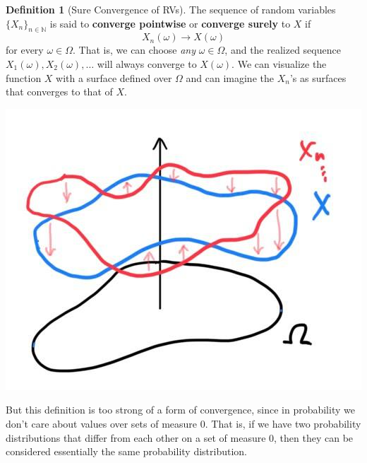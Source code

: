 \documentclass{article}
\theoremstyle{definition}
\theoremstyle{remark}
\theoremstyle{definition}
\newtheorem{definition}{Definition}[section]
\begin{document}
\begin{definition}[Sure Convergence of RVs]
The sequence of random variables $\{ X_n\}_{n \in \mathbb{N}}$ is said to \textbf{converge pointwise} or \textbf{converge surely} to $X$ if 
\[X_n (\omega) \rightarrow X (\omega)\]
for every $\omega \in \Omega$. That is, we can choose \textit{any} $\omega \in \Omega$, and the realized sequence $X_1 (\omega), X_2 (\omega), \ldots$ will always converge to $X(\omega)$. We can visualize the function $X$ with a surface defined over $\Omega$ and can imagine the $X_n$'s as surfaces that converges to that of $X$. 
\begin{center}
    \includegraphics[scale=0.3]{img/sure_convergence.jpg}
\end{center}
\end{definition}

But this definition is too strong of a form of convergence, since in probability we don't care about values over sets of measure $0$. That is, if we have two probability distributions that differ from each other on a set of measure $0$, then they can be considered essentially the same probability distribution. 
\end{document}
